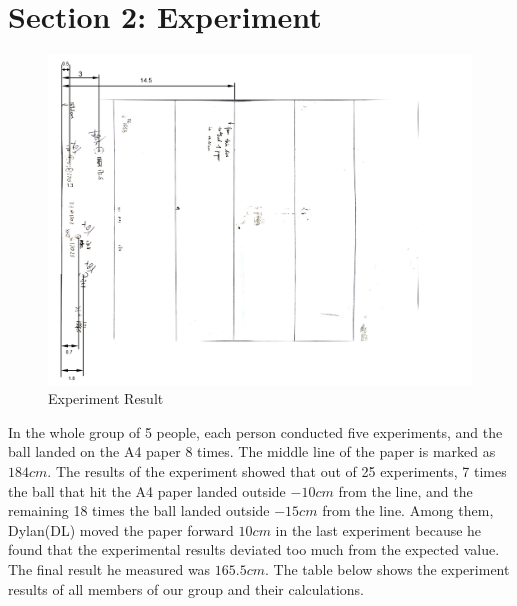 \documentclass{article}
\begin{document}
\section{Section 2: Experiment}
    \begin{figure}[H]
        \centering
        \includegraphics[width=1\linewidth]{experiment result.png}
        \caption{Experiment Result}
        \label{simplevr}
    \end{figure}
    In the whole group of 5 people, each person conducted five experiments, and the ball landed on the A4 paper 8 times. The middle line of the paper is marked as $184cm$. The results of the experiment showed that out of 25 experiments, 7 times the ball that hit the A4 paper landed outside $-10cm$ from the line, and the remaining 18 times the ball landed outside $-15cm$ from the line. Among them, Dylan(DL) moved the paper forward $10cm$ in the last experiment because he found that the experimental results deviated too much from the expected value. The final result he measured was $165.5cm$.
    The table below shows the experiment results of all members of our group and their calculations.
\end{document}
